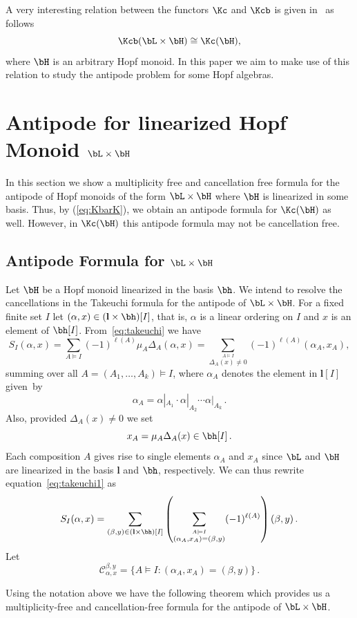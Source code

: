 A very interesting relation between the functors $\Kc$ and $\Kcb$ is given in~\cite[Theorem~15.13]{AM:2010} as follows
\begin{equation}\label{eq:KbarK}
 \Kcb(\bL\times\bH) \cong \Kc(\bH),
\end{equation}
where $\bH$ is an arbitrary Hopf monoid. In this paper we aim to make use of this relation to study the antipode problem for some Hopf algebras.


\section{Antipode for linearized Hopf Monoid \texorpdfstring{$\bL\times \bH$}{L times H}}\label{s:antiLxH}

In this section we show a multiplicity free and cancellation free formula for the antipode of Hopf monoids of the form $\bL\times \bH$ where $\bH$ is linearized in some basis. Thus, by (\ref{eq:KbarK}), we obtain an antipode formula for $\Kc(\bH)$ as well. However, in $\Kc(\bH)$ this antipode formula may not be cancellation free. 

\subsection{Antipode Formula for \texorpdfstring{$\bL\times \bH$}{L times H}}\label{ss:UsingTakeushi}

Let $\bH$ be a Hopf monoid linearized in the basis $\bh$. We intend to resolve the cancellations in the Takeuchi formula for the antipode of $\bL\times\bH$. For a fixed finite set $I$ let $(\alpha,x)\in (\mathbf{l}\times\bh)[I]$, that is, $\alpha$ is a linear ordering on $I$ and $x$ is an element of $\bh [I]$. From~\eqref{eq:takeuchi} we have
\begin{equation}\label{eq:takeuchi1}
 S_I(\alpha,x) = \sum_{A\models I} (-1)^{\ell(A)} \mu_A \Delta_A(\alpha,x)
 = \sum_{\stackrel{A\models I} %
 {\Delta_A(x)\ne 0}} (-1)^{\ell(A)} (\alpha_A,x_A),
\end{equation}
 summing over all $A=(A_1,\ldots,A_k)\models I$, where $\alpha_A$ denotes the element in $\mathbf{l} [I]$ given~by
 $$\alpha_A= \alpha|_{A_1}\cdot \alpha|_{A_2}\cdots \alpha|_{A_k}\,.
$$ Also, provided $\Delta_A(x)\neq 0$ we set
 $$x_A=\mu_A\Delta_A(x) \in \bh[I]\,.$$
Each composition $A$ gives rise to single elements $\alpha_A$ and $x_A$ since $\bL$ and $\bH$ are linearized in the basis $\mathbf{l}$ and $\bh$, respectively. 
We can thus rewrite equation~\eqref{eq:takeuchi1} as
\begin{equation}\label{eq:takeuchi2}
 S_I(\alpha,x) = \sum_{(\beta,y)\in (\mathbf{l}\times\bh)[I]}\left(\sum_{\stackrel{A\models I}
 {(\alpha_A,x_A)=(\beta,y)}} (-1)^{\ell(A)}\right) (\beta,y)\,.
\end{equation}
Let 
\begin{equation}\label{eq:alphabetaxy}
 \mathcal{C}_{\alpha,x}^{\beta,y}=\big\{A\models I : (\alpha_A,x_A)=(\beta,y)\big\}\,.
 \end{equation}

Using the notation above we have the following theorem which provides us a multiplicity-free and cancellation-free formula for the antipode of $\bL\times\bH$. 
